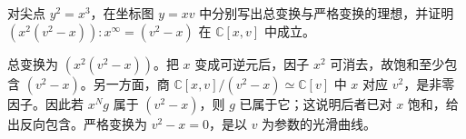 \begin{exercise}\label{b3:ex:D-cusp-strict-transform}
	对尖点 \(y^2=x^3\)，在坐标图 \(y=xv\) 中分别写出总变换与严格变换的理想，并证明 \((x^2(v^2-x)):x^\infty=(v^2-x)\) 在 \(\mathbb C[x,v]\) 中成立。
\end{exercise}
\begin{solution}
	总变换为 \((x^2(v^2-x))\)。把 \(x\) 变成可逆元后，因子 \(x^2\) 可消去，故饱和至少包含 \((v^2-x)\)。另一方面，商 \(\mathbb C[x,v]/(v^2-x)\simeq\mathbb C[v]\) 中 \(x\) 对应 \(v^2\)，是非零因子。因此若 \(x^Ng\) 属于 \((v^2-x)\)，则 \(g\) 已属于它；这说明后者已对 \(x\) 饱和，给出反向包含。严格变换为 \(v^2-x=0\)，是以 \(v\) 为参数的光滑曲线。
\end{solution}
